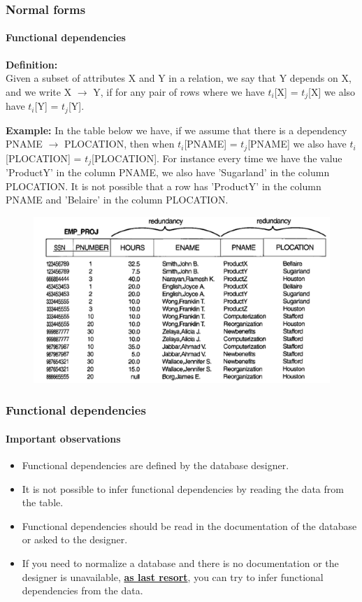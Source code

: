 \documentclass{beamer}
\newcommand{\tuple}[2]{$t_{#1}$[#2]}
\newcommand{\fdep}[2]{#1 $\rightarrow$ #2}
\begin{document}
\begin{frame}
	\frametitle{Normal forms}
	\framesubtitle{Functional dependencies}
	\textbf{Definition:}\\
	Given a subset of attributes X and Y in a relation, we say that Y depends on X, and we write \fdep{X}{Y}, if for any pair of rows where we have \tuple{i}{X} = \tuple{j}{X} we also have \tuple{i}{Y} = \tuple{j}{Y}.
	
	\tiny
	\textbf{Example: } In the table below we have, if we assume that there is a dependency \fdep{PNAME}{PLOCATION}, then when \tuple{i}{PNAME} = \tuple{j}{PNAME} we also have \tuple{i}{PLOCATION} = \tuple{j}{PLOCATION}. For instance every time we have the value 'ProductY' in the column PNAME, we also have 'Sugarland' in the column PLOCATION. It is not possible that a row has 'ProductY' in the column PNAME and 'Belaire' in the column PLOCATION.
	
	\begin{figure}
		\includegraphics[scale=0.4]{img/normalization/norm6}
	\end{figure}
\end{frame}

\begin{frame}
	\frametitle{Functional dependencies}
	\framesubtitle{Important observations}
	
	\begin{itemize}
		\item Functional dependencies are defined by the database designer.
		\item It is not possible to infer functional dependencies by reading the data from the table.
		\item Functional dependencies should be read in the documentation of the database or asked to the designer.
		\item If you need to normalize a database and there is no documentation or the designer is unavailable, \textbf{\underline{as last resort}}, you can try to infer functional dependencies from the data.		
	\end{itemize}
\end{frame}
\end{document}

